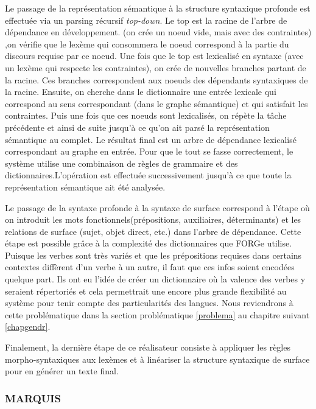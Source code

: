 Le passage de la représentation sémantique à la structure syntaxique profonde est effectuée via un parsing récursif \emph{top-down}. Le top est la racine de l'arbre de dépendance en développement. (on crée un noeud vide, mais avec des contraintes) ,on vérifie que le lexème qui consommera le noeud correspond à la partie du discours requise par ce noeud. Une fois que le top est lexicalisé en syntaxe (avec un lexème qui respecte les contraintes), on crée de nouvelles branches partant de la racine. Ces branches correspondent aux noeuds des dépendants syntaxiques de la racine. Ensuite, on cherche dans le dictionnaire une entrée lexicale qui correspond au sens correspondant (dans le graphe sémantique) et qui satisfait les contraintes. Puis une fois que ces noeuds sont lexicalisés, on répète la tâche précédente et ainsi de suite jusqu'à ce qu'on ait parsé la représentation sémantique au complet. Le résultat final est un arbre de dépendance lexicalisé correspondant au graphe en entrée. Pour que le tout se fasse correctement, le système utilise une combinaison de règles de grammaire et des dictionnaires.L'opération est effectuée successivement jusqu'à ce que toute la représentation sémantique ait été analysée.

Le passage de la syntaxe profonde à la syntaxe de surface correspond à l'étape où on introduit les mots fonctionnels(prépositions, auxiliaires, déterminants) et les relations de surface (sujet, objet direct, etc.) dans l'arbre de dépendance. Cette étape est possible grâce à la complexité des dictionnaires que FORGe utilise. Puisque les verbes sont très variés et que les prépositions requises dans certains contextes diffèrent d'un verbe à un autre, il faut que ces infos soient encodées quelque part. Ils ont eu l'idée de créer un dictionnaire où la valence des verbes y seraient répertoriés et cela permettrait une encore plus grande flexibilité au système pour tenir compte des particularités des langues. Nous reviendrons à cette problématique dans la section problématique \ref{problema} au chapitre suivant \ref{chapgendr}.

Finalement, la dernière étape de ce réalisateur consiste à appliquer les règles morpho-syntaxiques aux lexèmes et à linéariser la structure syntaxique de surface pour en générer un texte final.

\subsubsection{MARQUIS}\label{sectionmarquis}

